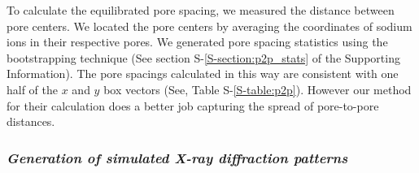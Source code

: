 \documentclass[journal=jpcbfk,manuscript=article]{achemso}
\begin{document}
  To calculate the equilibrated pore spacing, we measured the distance between
  pore centers. We located the pore centers by averaging the coordinates of sodium
  ions in their respective pores. We generated pore spacing statistics 
  using the bootstrapping technique (See section S-\ref{S-section:p2p_stats} of the
  Supporting Information). 
  The pore spacings calculated in this way are consistent
  with one half of the $x$ and $y$ box vectors (See, Table S-\ref{S-table:p2p}). However
  our method for their calculation does a better job capturing the spread of 
  pore-to-pore distances.

%

  \subsubsection{\textit{Generation of simulated X-ray diffraction patterns}}\label{method:xrd}
  
\end{document}

